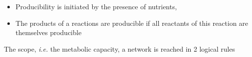 \documentclass[8pt]{beamer}
\begin{document}
\begin{frame}
\begin{onlyenv}
\begin{minipage}{0.5\textwidth}
\end{minipage}%
\begin{minipage}{0.55\textwidth}
\begin{itemize}
\item Producibility is initiated by the presence of nutrients,
\item The products of a reactions are producible if all reactants of this reaction are themselves producible
\end{itemize}
%
\end{minipage}

\begin{block}{}
The scope, \textit{i.e.} the metabolic capacity,  a network is reached in 2 logical rules \tiny \citep{Ebenhoh2004}
\end{block}
\end{onlyenv}
\end{frame}
\end{document}
